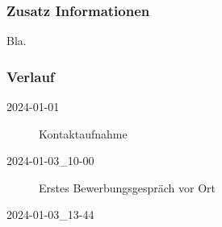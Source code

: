 \documentclass{scrartcl}
\begin{document}
{        \subsubsection{Zusatz Informationen}\label{subsubsec:zusatz-informationen2}
        Bla.

        \subsubsection{Verlauf}\label{subsubsec:verlauf2}
        \begin{description}
            \item[2024-01-01] Kontaktaufnahme
            \item[2024-01-03\_10-00] Erstes Bewerbungsgespräch vor Ort
            \item[2024-01-03\_13-44] 
        \end{description}
    }
\end{document}
